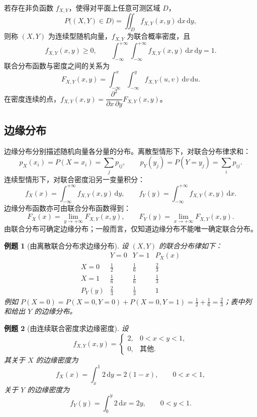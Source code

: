 \documentclass[11pt,a4paper,fontset=fandol]{ctexart}
\newtheorem{example}{例题}[section]
\theoremstyle{remark}
\begin{document}
若存在非负函数 $f_{X,Y}$，使得对平面上任意可测区域 $D$，
\[
    P\bigl((X,Y)\in D\bigr)
    =\iint_D f_{X,Y}(x,y)\,\mathrm{d}x\,\mathrm{d}y,
\]
则称 $(X,Y)$ 为连续型随机向量，$f_{X,Y}$ 为联合概率密度，且
\[
    f_{X,Y}(x,y)\geq 0,\qquad
    \int_{-\infty}^{+\infty}\int_{-\infty}^{+\infty}
    f_{X,Y}(x,y)\,\mathrm{d}x\,\mathrm{d}y=1.
\]
联合分布函数与密度之间的关系为
\[
    F_{X,Y}(x,y)=\int_{-\infty}^{x}\int_{-\infty}^{y}
    f_{X,Y}(u,v)\,\mathrm{d}v\,\mathrm{d}u.
\]
在密度连续的点，$f_{X,Y}(x,y)=\dfrac{\partial^2}{\partial x\,\partial y}F_{X,Y}(x,y)$。

\subsection{边缘分布}
边缘分布分别描述随机向量各分量的分布。离散型情形下，对联合分布律求和：
\[
    p_X(x_i)=P(X=x_i)=\sum_jp_{ij},\qquad
    p_Y(y_j)=P(Y=y_j)=\sum_ip_{ij}.
\]
连续型情形下，对联合密度沿另一变量积分：
\[
    f_X(x)=\int_{-\infty}^{+\infty}f_{X,Y}(x,y)\,\mathrm{d}y,\qquad
    f_Y(y)=\int_{-\infty}^{+\infty}f_{X,Y}(x,y)\,\mathrm{d}x.
\]
边缘分布函数亦可由联合分布函数得到：
\[
    F_X(x)=\lim_{y\to+\infty}F_{X,Y}(x,y),\qquad
    F_Y(y)=\lim_{x\to+\infty}F_{X,Y}(x,y).
\]
由联合分布可确定边缘分布；一般而言，仅知道边缘分布不能唯一确定联合分布。

\begin{example}[由离散联合分布求边缘分布]
设 $(X,Y)$ 的联合分布律如下：
\[
\begin{array}{c|cc|c}
    &Y=0&Y=1&P_X(x)\\
    \hline
    X=0&\frac12&\frac16&\frac23\\
    X=1&\frac16&\frac16&\frac13\\
    \hline
    P_Y(y)&\frac23&\frac13&1
\end{array}
\]
例如 $P(X=0)=P(X=0,Y=0)+P(X=0,Y=1)=\frac12+\frac16=\frac23$；表中列和给出 $Y$ 的边缘分布。
\end{example}

\begin{example}[由连续联合密度求边缘密度]
设
\[
    f_{X,Y}(x,y)=
    \begin{cases}
        2,&0<x<y<1,\\
        0,&\text{其他}.
    \end{cases}
\]
其关于 $X$ 的边缘密度为
\[
    f_X(x)=\int_x^1 2\,\mathrm{d}y=2(1-x),
    \qquad 0<x<1,
\]
关于 $Y$ 的边缘密度为
\[
    f_Y(y)=\int_0^y 2\,\mathrm{d}x=2y,
    \qquad 0<y<1.
\]
\end{example}
\end{document}
